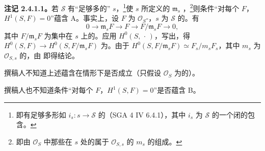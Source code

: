\textbf{注记 2.4.1.1。}若 $\mathcal S$ 有“足够多的” $s$，\footnote{即有足够多形如 $i_s:s\to\mathcal S$ 的（SGA 4 IV 6.4.1），其中 $i_s$ 为 $\mathcal S$ 的一个闭的包含。}使 $s$ 所定义的 $\mathfrak m_s$ ，\footnote{即由 $\mathcal O_S$ 中那些在 $s$ 处的属于 $\mathcal O_{S,s}$ 的 $m_s$ 的组成。}则条件“对每个 $F$，$H^1(S,F)=0$”蕴含 A。事实上，设 $F$ 为 $\mathcal O_S$-，$s$ 为 $\mathcal S$ 的。有
\[
0\longrightarrow\mathfrak m_sF\longrightarrow F\longrightarrow F/\mathfrak m_sF\longrightarrow0,
\]
其中 $F/\mathfrak m_sF$ 为集中在 $s$ 上的。应用 $H^0(S,\,\cdot\,)$，写出，得 $H^0(S,F)\to H^0(S,F/\mathfrak m_sF)$ 为。由于 $H^0(S,F/\mathfrak m_sF)\simeq F_s/m_sF_s$，其中 $m_s$ 为 $\mathcal O_{S,s}$ 的，由 即得结论。

撰稿人不知道上述蕴含在情形下是否成立（只假设 $\mathcal O_S$ 为的）。

撰稿人也不知道条件“对每个 $F$，$H^1(S,F)=0$”是否蕴含 B。


